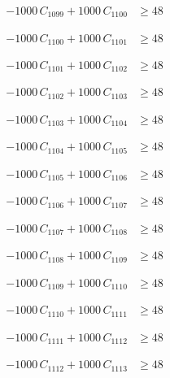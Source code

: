 \documentclass[a4paper,11pt]{article}
\begin{document}
\begin{align}
-1000\,C_{1099} + 1000\,C_{1100} &\geq 48 \nonumber
\end{align}

\begin{align}
-1000\,C_{1100} + 1000\,C_{1101} &\geq 48 \nonumber
\end{align}

\begin{align}
-1000\,C_{1101} + 1000\,C_{1102} &\geq 48 \nonumber
\end{align}

\begin{align}
-1000\,C_{1102} + 1000\,C_{1103} &\geq 48 \nonumber
\end{align}

\begin{align}
-1000\,C_{1103} + 1000\,C_{1104} &\geq 48 \nonumber
\end{align}

\begin{align}
-1000\,C_{1104} + 1000\,C_{1105} &\geq 48 \nonumber
\end{align}

\begin{align}
-1000\,C_{1105} + 1000\,C_{1106} &\geq 48 \nonumber
\end{align}

\begin{align}
-1000\,C_{1106} + 1000\,C_{1107} &\geq 48 \nonumber
\end{align}

\begin{align}
-1000\,C_{1107} + 1000\,C_{1108} &\geq 48 \nonumber
\end{align}

\begin{align}
-1000\,C_{1108} + 1000\,C_{1109} &\geq 48 \nonumber
\end{align}

\begin{align}
-1000\,C_{1109} + 1000\,C_{1110} &\geq 48 \nonumber
\end{align}

\begin{align}
-1000\,C_{1110} + 1000\,C_{1111} &\geq 48 \nonumber
\end{align}

\begin{align}
-1000\,C_{1111} + 1000\,C_{1112} &\geq 48 \nonumber
\end{align}

\begin{align}
-1000\,C_{1112} + 1000\,C_{1113} &\geq 48 \nonumber
\end{align}
\end{document}
